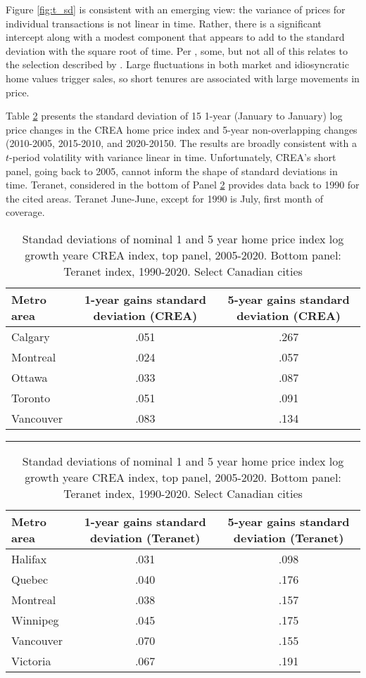\documentclass[12pt]{article}
\begin{document}
Figure \ref{fig:t_sd} is consistent with an emerging view: the variance of
prices for individual transactions is not linear in time. Rather, there is a
significant intercept along with a modest component that appears to add to the
standard deviation with the square root of time. Per \textcite{Giacoletti},
some, but not all of this relates to the selection described by
\textcite{Sagi}. Large fluctuations in both market and idiosyncratic home
values trigger sales, so short tenures are associated with large movements in
price.

Table \ref{tab:crea} presents the standard deviation of 15 1-year (January to January) log price changes in the CREA home price index and 5-year non-overlapping changes (2010-2005, 2015-2010, and 2020-20150. The results are broadly consistent with a $t$-period volatility with variance linear in time. Unfortunately, CREA's short panel, going back to 2005, cannot inform the shape of standard deviations in time. Teranet, considered in the bottom of Panel \ref{tab:crea} provides data back to 1990 for the cited areas. Teranet June-June, except for 1990 is July, first month of coverage.

\begin{table}
	\caption{\label{tab:crea}Standad deviations of nominal 1 and 5 year home price index log growth yeare CREA index, top panel, 2005-2020. Bottom panel: Teranet index, 1990-2020. Select Canadian cities}
	\begin{tabular}{lcc}
		\hline
		Metro area & 1-year gains standard deviation (CREA) & 5-year gains standard deviation (CREA)\\
		\hline\hline
		 Calgary & .051 & .267 \\
		 Montreal & .024 & .057\\
		 Ottawa & .033 & .087\\
		 Toronto & .051 & .091\\
		 Vancouver & .083 & .134\\
		\hline
	\end{tabular}
	\hrule

	\begin{tabular}{lcc}
		\hline
		Metro area & 1-year gains standard deviation (Teranet) & 5-year gains standard deviation (Teranet)\\
		\hline\hline
		 Halifax & .031 & .098\\
		 Quebec & .040 & .176\\
		 Montreal & .038 & .157\\
		 Winnipeg & .045 & .175\\
		 Vancouver & .070 & .155\\
		 Victoria & .067 & .191\\
		\hline
	\end{tabular}
\end{table}
\end{document}
